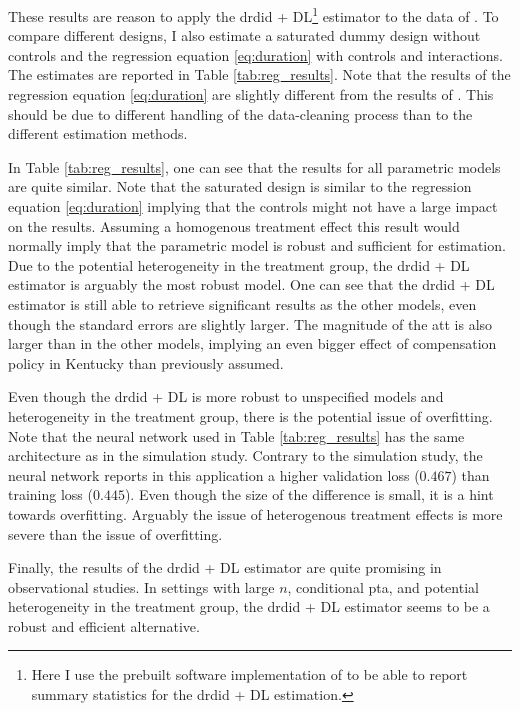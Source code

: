 These results are reason to apply the \ac{drdid} + DL\footnote[5]{Here I use the prebuilt software implementation of \citet*{doubleml2024R} to be able to report summary statistics for the \ac{drdid} + DL estimation.} estimator to the data of \citet{meyer1990workers}.
To compare different designs, I also estimate a saturated dummy design without controls and the regression equation \ref{eq:duration} with controls and interactions.
The estimates are reported in Table \ref{tab:reg_results}.
Note that the results of the regression equation \ref{eq:duration} are slightly different from the results of \citet{meyer1990workers}.
This should be due to different handling of the data-cleaning process than to the different estimation methods.



In Table \ref{tab:reg_results}, one can see that the results for all parametric models are quite similar.
Note that the saturated design is similar to the regression equation \ref{eq:duration} implying that the controls might not have a large impact on the results.
Assuming a homogenous treatment effect this result would normally imply that the parametric model is robust and sufficient for estimation.
Due to the potential heterogeneity in the treatment group, the \ac{drdid} + DL estimator is arguably the most robust model.
One can see that the \ac{drdid} + DL estimator is still able to retrieve significant results as the other models, even though the standard errors are slightly larger.
The magnitude of the \ac{att} is also larger than in the other models, implying an even bigger effect of compensation policy in Kentucky than previously assumed.

Even though the \ac{drdid} + DL is more robust to unspecified models and heterogeneity in the treatment group, there is the potential issue of overfitting.
Note that the neural network used in Table \ref{tab:reg_results} has the same architecture as in the simulation study.
Contrary to the simulation study, the neural network reports in this application a higher validation loss ($0.467$) than training loss ($0.445$).
Even though the size of the difference is small, it is a hint towards overfitting.
Arguably the issue of heterogenous treatment effects is more severe than the issue of overfitting.

Finally, the results of the \ac{drdid} + DL estimator are quite promising in observational studies.
In settings with large $n$, conditional \ac{pta}, and potential heterogeneity in the treatment group, the \ac{drdid} + DL estimator seems to be a robust and efficient alternative.
